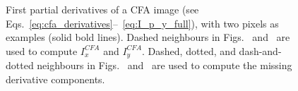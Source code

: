 \documentclass[twoside]{article}
\begin{document}
\begin{figure}
{	}
	\quad
	\caption{First partial derivatives of a CFA image (see Eqs.~\eqref{eq:cfa_derivatives}--~\eqref{eq:I_p_y_full}), with two pixels as examples (solid bold lines). Dashed neighbours in Figs.~ and~ are used to compute $I^{CFA}_x$ and $I^{CFA}_y$. Dashed, dotted, and dash-and-dotted neighbours in Figs.~ and~ are used to compute the missing derivative components.}
	\label{fig:cfa_derivatives}
\end{figure}
\end{document}
